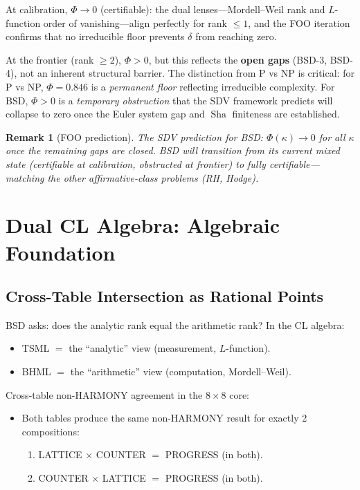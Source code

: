 \documentclass[11pt]{article}
\newtheorem{remark}[theorem]{Remark}
\DeclareMathOperator{\Sha}{Sha}
\begin{document}
\noindent
At calibration, $\Phi \to 0$ (certifiable): the dual lenses---Mordell--Weil
rank and $L$-function order of vanishing---align perfectly for rank $\leq 1$,
and the FOO iteration confirms that no irreducible floor prevents $\delta$
from reaching zero.

At the frontier (rank $\geq 2$), $\Phi > 0$, but this reflects the
\textbf{open gaps} (BSD-3, BSD-4), not an inherent structural barrier.  The
distinction from P vs NP is critical: for P vs NP, $\Phi = 0.846$ is a
\emph{permanent floor} reflecting irreducible complexity.  For BSD,
$\Phi > 0$ is a \emph{temporary obstruction} that the SDV framework predicts
will collapse to zero once the Euler system gap and $\Sha$ finiteness are
established.

\begin{remark}[FOO prediction]
The SDV prediction for BSD: $\Phi(\kappa) \to 0$ for all $\kappa$ once the
remaining gaps are closed.  BSD will transition from its current
mixed state (certifiable at calibration, obstructed at frontier) to
fully certifiable---matching the other affirmative-class problems (RH, Hodge).
\end{remark}

\section{Dual CL Algebra: Algebraic Foundation}
\label{sec:dual-cl-algebra}

\subsection{Cross-Table Intersection as Rational Points}

BSD asks: does the analytic rank equal the arithmetic rank?  In the CL algebra:
\begin{itemize}
  \item TSML $=$ the ``analytic'' view (measurement, $L$-function).
  \item BHML $=$ the ``arithmetic'' view (computation, Mordell--Weil).
\end{itemize}

Cross-table non-HARMONY agreement in the $8 \times 8$ core:
\begin{itemize}
  \item Both tables produce the same non-HARMONY result for exactly 2 compositions:
    \begin{enumerate}
      \item LATTICE $\times$ COUNTER $=$ PROGRESS \quad (in both).
      \item COUNTER $\times$ LATTICE $=$ PROGRESS \quad (in both).
    \end{enumerate}
\end{itemize}
\end{document}

